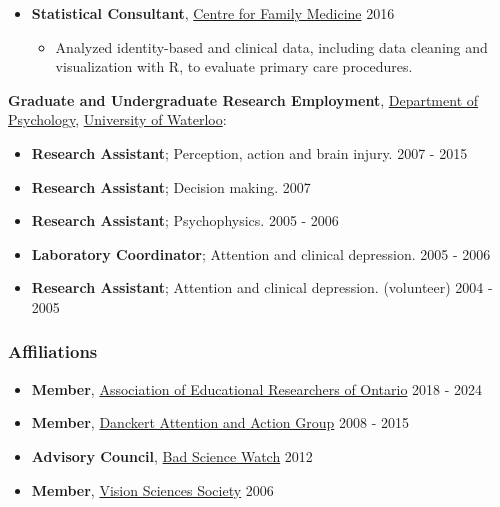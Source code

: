 \documentclass[10pt]{article}
\providecommand{\tightlist}{%
  \setlength{\itemsep}{0pt}\setlength{\parskip}{0pt}}
\begin{document}
\pagebreak[2]

\begin{itemize}
\item
  \textbf{Statistical Consultant},
  \href{https://family-medicine.ca/}{Centre for Family Medicine}
  \hfill 2016

  \begin{itemize}
  \tightlist
  \item
    Analyzed identity-based and clinical data, including data cleaning
    and visualization with R, to evaluate primary care procedures.
  \end{itemize}
\end{itemize}

\pagebreak[2]

\textbf{Graduate and Undergraduate Research Employment},
\href{http://psychology.uwaterloo.ca}{Department of Psychology},
\href{http://www.uwaterloo.ca/}{University of Waterloo}:

\begin{itemize}
\tightlist
\item
  \textbf{Research Assistant}; Perception, action and brain injury.
  \hfill 2007 - 2015
\item
  \textbf{Research Assistant}; Decision making. \hfill             2007
\item
  \textbf{Research Assistant}; Psychophysics. \hfill               2005
  - 2006
\item
  \textbf{Laboratory Coordinator}; Attention and clinical depression.
  \hfill                 2005 - 2006
\item
  \textbf{Research Assistant}; Attention and clinical depression.
  (volunteer) \hfill                    2004 - 2005
\end{itemize}

\pagebreak[3]

\subsubsection{Affiliations}\label{affiliations}

\begin{itemize}
\tightlist
\item
  \textbf{Member}, \href{https://www.aero-aoce.org}{Association of
  Educational Researchers of Ontario} \hfill 2018 - 2024
\item
  \textbf{Member}, \href{http://thedaag.uwaterloo.ca/}{Danckert
  Attention and Action Group} \hfill 2008 - 2015
\item
  \textbf{Advisory Council}, \href{http://badsciencewatch.ca}{Bad
  Science Watch} \hfill 2012
\item
  \textbf{Member}, \href{VisionSciences.ca}{Vision Sciences Society}
  \hfill 2006
\end{itemize}
\end{document}
